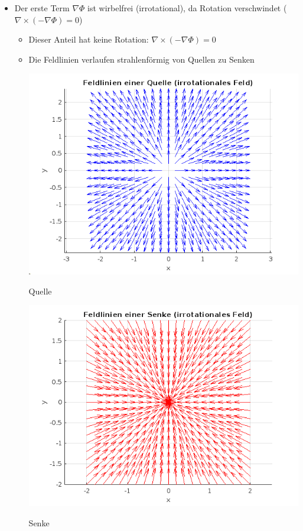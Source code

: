 \begin{itemize}
\item Der erste Term $ \nabla \Phi $ ist wirbelfrei (irrotational), da Rotation verschwindet ($\nabla \times (-\nabla \Phi) = 0$) 
\begin{itemize}
\item Dieser Anteil hat keine Rotation: $\nabla \times (-\nabla \Phi) = 0$
\item Die Feldlinien verlaufen strahlenförmig von Quellen zu Senken
\begin{table}[h]
\centering
\includegraphics[scale=0.3]{papers/helmholtz/images/Quelle.png}
\caption{Quelle}
\label{fig:quelle}
\end{table}
 \begin{table}[h]
        \centering
        \includegraphics[scale=0.3]{papers/helmholtz/images/Senke.png} 
        \caption{Senke}
        \label{fig:senke}
\end{table}


\end{itemize}
\end{itemize}
